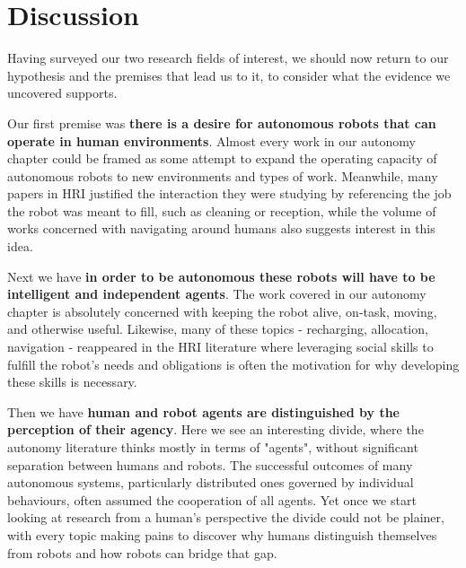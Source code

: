 \documentclass{sfuthesis}
\begin{document}







\chapter{Discussion}

Having surveyed our two research fields of interest, we should now return to our hypothesis and the premises that lead us to it, to consider what the evidence we uncovered supports.

Our first premise was \textbf{there is a desire for autonomous robots that can operate in human environments}. Almost every work in our autonomy chapter could be framed as some attempt to expand the operating capacity of autonomous robots to new environments and types of work. Meanwhile, many papers in HRI justified the interaction they were studying by referencing the job the robot was meant to fill, such as cleaning or reception, while the volume of works concerned with navigating around humans also suggests interest in this idea.

Next we have \textbf{in order to be autonomous these robots will have to be intelligent and independent agents}. The work covered in our autonomy chapter is absolutely concerned with keeping the robot alive, on-task, moving, and otherwise useful. Likewise, many of these topics - recharging, allocation, navigation - reappeared in the HRI literature where leveraging social skills to fulfill the robot's needs and obligations is often the motivation for why developing these skills is necessary.

Then we have \textbf{human and robot agents are distinguished by the perception of their agency}. Here we see an interesting divide, where the autonomy literature thinks mostly in terms of "agents", without significant separation between humans and robots. The successful outcomes of many autonomous systems, particularly distributed ones governed by individual behaviours, often assumed the cooperation of all agents. Yet once we start looking at research from a human's perspective the divide could not be plainer, with every topic making pains to discover why humans distinguish themselves from robots and how robots can bridge that gap.
\end{document}
